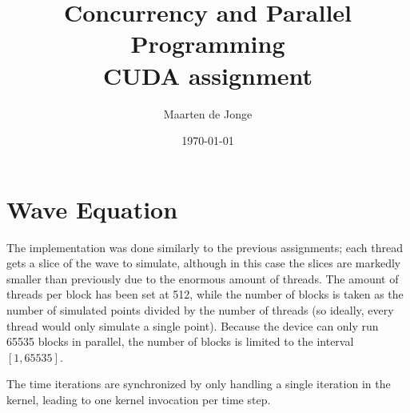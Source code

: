 \documentclass[a4paper]{article}
\author{Maarten de Jonge}
\date{\today}
\title{Concurrency and Parallel Programming \\
\large{CUDA assignment}}
\begin{document}
\maketitle

\section*{Wave Equation}
The implementation was done similarly to the previous assignments; each thread
gets a slice of the wave to simulate, although in this case the slices are
markedly smaller than previously due to the enormous amount of threads. The
amount of threads per block has been set at 512, while the number of blocks is
taken as the number of simulated points divided by the number of threads (so
ideally, every thread would only simulate a single point). Because the device
can only run 65535 blocks in parallel, the number of blocks is limited to the
interval $[1, 65535]$.

The time iterations are synchronized by only handling a single iteration in the
kernel, leading to one kernel invocation per time step.
\end{document}
